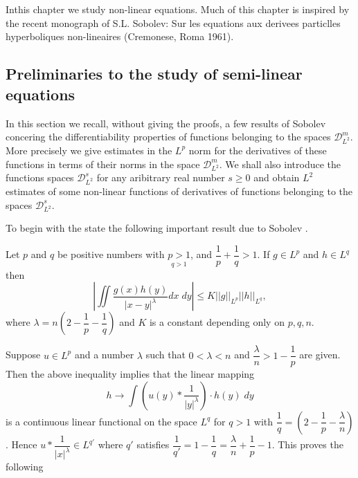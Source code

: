 \chapter{}\label{chap5}

In\pageoriginale this chapter we study non-linear equations. Much of
this chapter is 
inspired by the recent monograph of S.L. Sobolev: Sur les equations
aux derivees particlles hyperboliques non-lineaires (Cremonese, Roma
1961). 

\section[Preliminaries to the study of semi-linear
  equa\-tions]{Preliminaries to the study of semi-linear\hfill\break
  equa\-tions}\label{chap5-sec1} 

In this section we recall, without giving the proofs, a few results
of Sobolev concering the differentiability properties of functions
belonging to the spaces $\mathscr{D}^m_{L^2}$. More precisely we give
estimates in the $L^p$ norm for the derivatives of these functions in
terms of their norms in the space $\mathscr{D}^m_{L^2}$. We shall also
introduce the functions spaces $\mathscr{D}^s_{L^2}$ for any
aribitrary real number $s \geq 0$ and obtain $L^2$ estimates of some
non-linear functions of derivatives of functions belonging to the
spaces $\mathscr{D}^s_{L^2}$.  

To begin with the state the following important result due to Sobolev
\cite{key1}.  

\setcounter{proposition}{0}
\begin{proposition}\label{chap5-sec1-prop1}  %
 Let $p$ and $q$ be positive numbers with $\underset{q>1}{p>1}$, and
 $\dfrac{1}{p} + \dfrac{1}{q}>1$. If $g \in L^p $ and $h
 \in L^q$ then  
\begin{equation*}
\left| \iint \frac{g(x)h(y)}{|x-y|^\lambda}  dx \; dy \right| \leq K
|| g ||_{L^p} || h ||_{L^q},  \tag{1.1}\label{chap5-eq1.1}
\end{equation*}
where $\lambda = n (2 - \dfrac{1}{p} - \dfrac{1}{q})$ and $K$ is a
constant depending only on $p, q, n$.  

Suppose $u \in L^p$ and a number $\lambda$ such that $0 <
\lambda < n$ and $\dfrac{\lambda}{n} > 1 - \dfrac{1}{p}$ are
given. Then the above inequality implies that the linear mapping  
\begin{equation*}
h\to \int (u (y) * \frac{1}{|y|^\lambda}) \cdot h (y) \; dy
\tag{1.2}\label{chap5-eq1.2}  
\end{equation*}\pageoriginale
is a continuous linear functional on the space $L^q$ for $q > 1$ with
$\dfrac{1}{q} = \left(2 - \dfrac{1}{p} - \dfrac{\lambda}{n}\right)$. 
Hence $u *\dfrac{1}{|x|^\lambda} \in L^{q'}$ where $q'$ satisfies
$\dfrac{1}{q'} =  1 - \dfrac{1}{q} = \dfrac{\lambda}{n} +
\dfrac{1}{p} - 1$. This proves the following
\end{proposition}

